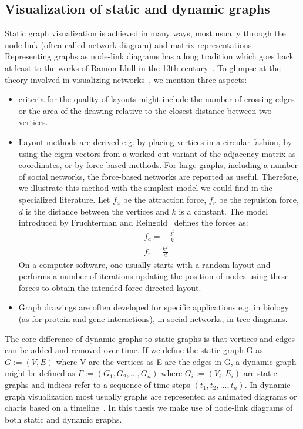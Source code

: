 \subsection{Visualization of static and dynamic graphs}
Static graph visualization is achieved in many ways,
most usually through the node-link (often called network diagram)
and matrix representations.
Representing graphs as node-link diagrams has a long tradition which goes back 
at least to the works of Ramon Llull in the 13th century~\cite{llull}.
To glimpse at the theory involved in visualizing networks~\cite{eades}, we mention three aspects:
\begin{itemize}
\item criteria for the quality of layouts might include the number of crossing edges or the area of the drawing relative to the closest distance between two vertices.
\item Layout methods are derived e.g. by placing vertices in a circular fashion, by using the eigen vectors from a worked out variant of the adjacency matrix as coordinates, or by force-based methods. For large graphs, including a number of social networks, the force-based networks are reported as useful. Therefore, we illustrate this method with the simplest model we could find in the specialized literature. Let $f_a$ be the attraction force, $f_r$ be the repulsion force, $d$ is the distance between the vertices and $k$ is a constant. The model introduced by Fruchterman and Reingold~\cite{fr} defines the forces as:
\begin{align}
f_a = -\frac{d^2}{k}\\
f_r = \frac{k^2}{d}
\end{align}
On a computer software, one usually starts with a random layout and performs a number of iterations updating the position of nodes
using these forces to obtain the intended force-directed layout.
\item Graph drawings are often developed for specific applications e.g. in biology (as for protein and gene interactions), in social networks, in tree diagrams.
\end{itemize}

The core difference of dynamic graphs to static graphs is that vertices and edges
can be added and removed over time.
If we define the static graph G as $G:=(V,E)$ where V are the vertices as E are the edges in G,
a dynamic graph might be defined as $\Gamma:=(G_1,G_2,...,G_n)$ where $G_i:=(V_i,E_i)$
are static graphs and indices refer to a sequence of time steps $(t_1,t_2,...,t_n)$.
In dynamic graph visualization most usually graphs are represented as animated diagrams
or charts based on a timeline~\cite{dynGraph}.
In this thesis we make use of node-link diagrams of both static and dynamic graphs.

